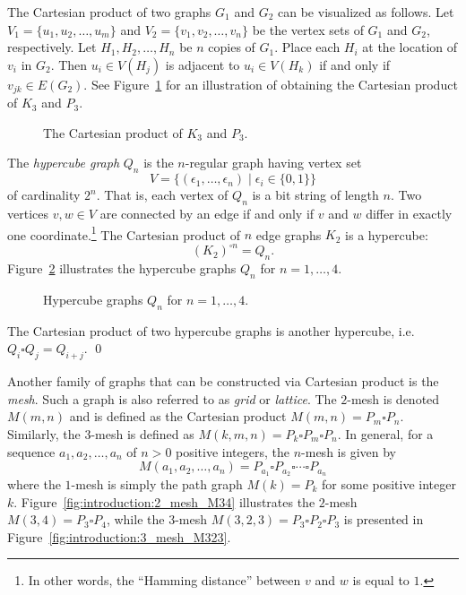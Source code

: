 The Cartesian product of two graphs $G_1$ and $G_2$ can be visualized
as follows. Let $V_1 = \{u_1, u_2, \dots, u_m\}$ and
$V_2 = \{v_1, v_2, \dots, v_n\}$ be the vertex sets of $G_1$ and
$G_2$, respectively. Let $H_1, H_2, \dots, H_n$ be $n$ copies of
$G_1$. Place each $H_i$ at the location of $v_i$ in $G_2$. Then
$u_i \in V(H_j)$ is adjacent to $u_i \in V(H_k)$ if and only if
$v_{jk} \in E(G_2)$. See
Figure~\ref{fig:introduction:Cartesian_product_K3_P3} for an
illustration of obtaining the Cartesian product of $K_3$ and $P_3$.

\begin{figure}[!htbp]
\centering

\caption{The Cartesian product of $K_3$ and $P_3$.}
\label{fig:introduction:Cartesian_product_K3_P3}
\end{figure}

The \emph{hypercube graph} $Q_n$ is the $n$-regular graph having
vertex set
\[
V
=
\big\{ (\epsilon_1,\dots,\epsilon_n) \;|\; \epsilon_i \in \{0,1\} \big\}
\]
of cardinality $2^n$. That is, each vertex of $Q_n$ is a bit string of
length $n$. Two vertices $v,w \in V$ are connected by an edge if and
only if $v$ and $w$ differ in exactly one coordinate.\footnote{
In other words, the ``Hamming distance'' between $v$ and $w$ is equal
to $1$.}
The Cartesian product of $n$ edge graphs $K_2$ is a hypercube:
\[
(K_2)^{\square n} = Q_n.
\]
Figure~\ref{fig:introduction:hypercube_graphs} illustrates the
hypercube graphs $Q_n$ for $n = 1,\dots,4$.

\begin{figure}[!htbp]
\centering

\caption{Hypercube graphs $Q_n$ for $n = 1,\dots,4$.}
\label{fig:introduction:hypercube_graphs}
\end{figure}

\begin{example}
\rm
The Cartesian product of two hypercube graphs is another
hypercube, i.e. $Q_i \square Q_j = Q_{i+j}$. \qed
\end{example}

Another family of graphs that can be constructed via Cartesian product
is the \emph{mesh}. Such a graph is also referred to as \emph{grid} or
\emph{lattice}. The $2$-mesh is denoted $M(m,n)$ and is defined as the
Cartesian product $M(m,n) = P_m \square P_n$. Similarly, the $3$-mesh
is defined as $M(k,m,n) = P_k \square P_m \square P_n$. In general,
for a sequence $a_1, a_2, \dots, a_n$ of $n > 0$ positive integers,
the $n$-mesh is given by
\[
M(a_1, a_2, \dots, a_n)
=
P_{a_1} \square P_{a_2} \square \cdots \square P_{a_n}
\]
where the $1$-mesh is simply the path graph $M(k) = P_k$ for some
positive integer $k$. Figure~\ref{fig:introduction:2_mesh_M34}
illustrates the $2$-mesh $M(3,4) = P_3 \square P_4$, while the
$3$-mesh $M(3,2,3) = P_3 \square P_2 \square P_3$ is presented in
Figure~\ref{fig:introduction:3_mesh_M323}.

